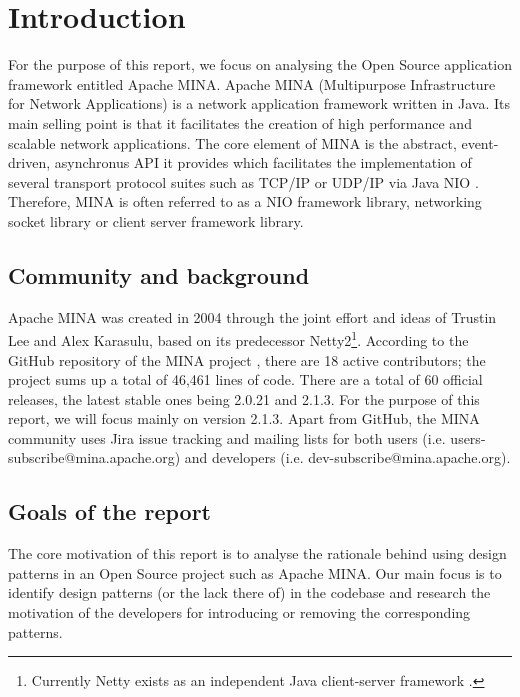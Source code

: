 \section{Introduction}
\label{sec:introduction}

For the purpose of this report, we focus on analysing the Open Source application framework entitled Apache MINA. Apache MINA (Multipurpose Infrastructure for Network Applications) \cite{mina-website} is a network application framework written in Java. Its main selling point is that it facilitates the creation of high performance and scalable network applications. The core element of MINA is the abstract, event-driven, asynchronus API it provides which facilitates the implementation of several transport protocol suites such as TCP/IP or UDP/IP via Java NIO \cite{oracle-nio}. Therefore, MINA is often referred to as a NIO framework library, networking socket library or client server framework library.

\subsection{Community and background}
Apache MINA was created in 2004 through the joint effort and ideas of Trustin Lee and Alex Karasulu, based on its predecessor Netty2\footnote{Currently Netty exists as an independent Java client-server framework \cite{netty}.}. According to the GitHub repository of the MINA project \cite{mina-github}, there are 18 active contributors; the project sums up a total of 46,461 lines of code. There are a total of 60 official releases, the latest stable ones being 2.0.21 and 2.1.3. For the purpose of this report, we will focus mainly on version 2.1.3. Apart from GitHub, the MINA community uses Jira issue tracking \cite{mina-jira} and mailing lists for both users (i.e. users-subscribe@mina.apache.org) and developers (i.e. dev-subscribe@mina.apache.org). 

\subsection{Goals of the report}
The core motivation of this report is to analyse the rationale behind using design patterns in an Open Source project such as Apache MINA. Our main focus is to identify design patterns (or the lack there of) in the codebase and research the motivation of the developers for introducing or removing the corresponding patterns.

